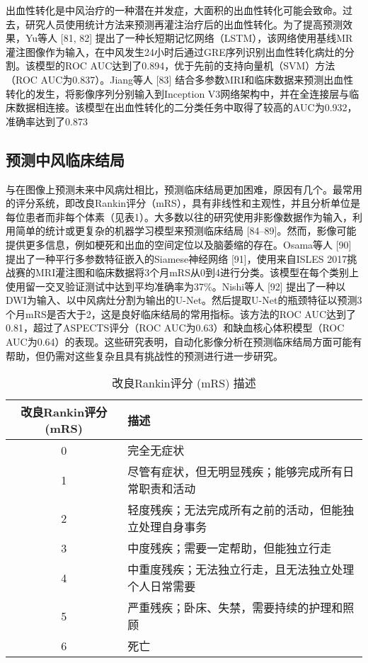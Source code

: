 \documentclass[11pt]{article}
\begin{document}
出血性转化是中风治疗的一种潜在并发症，大面积的出血性转化可能会致命。过去，研究人员使用统计方法来预测再灌注治疗后的出血性转化。为了提高预测效果，Yu等人 [81, 82] 提出了一种长短期记忆网络（LSTM），该网络使用基线MR灌注图像作为输入，在中风发生24小时后通过GRE序列识别出血性转化病灶的分割。该模型的ROC AUC达到了0.894，优于先前的支持向量机（SVM）方法（ROC AUC为0.837）。Jiang等人 [83] 结合多参数MRI和临床数据来预测出血性转化的发生，将影像序列分别输入到Inception V3网络架构中，并在全连接层与临床数据相连接。该模型在出血性转化的二分类任务中取得了较高的AUC为0.932，准确率达到了0.873

\subsection{\kaishu 预测中风临床结局}

与在图像上预测未来中风病灶相比，预测临床结局更加困难，原因有几个。最常用的评分系统，即改良Rankin评分（mRS），具有非线性和主观性，并且分析单位是每位患者而非每个体素（见表1）。大多数以往的研究使用非影像数据作为输入，利用简单的统计或更复杂的机器学习模型来预测临床结局 [84–89]。然而，影像可能提供更多信息，例如梗死和出血的空间定位以及脑萎缩的存在。Osama等人 [90] 提出了一种平行多参数特征嵌入的Siamese神经网络 [91]，使用来自ISLES 2017挑战赛的MRI灌注图和临床数据将3个月mRS从0到4进行分类。该模型在每个类别上使用留一交叉验证测试中达到平均准确率为37\%。Nishi等人 [92] 提出了一种以DWI为输入、以中风病灶分割为输出的U-Net。然后提取U-Net的瓶颈特征以预测3个月mRS是否大于2，这是良好临床结局的常用指标。该方法的ROC AUC达到了0.81，超过了ASPECTS评分（ROC AUC为0.63）和缺血核心体积模型（ROC AUC为0.64）的表现。这些研究表明，自动化影像分析在预测临床结局方面可能有帮助，但仍需对这些复杂且具有挑战性的预测进行进一步研究。

\begin{table}[h]
	\centering
	\begin{tabular}{|c|p{10cm}|}
		\hline
		\textbf{\kaishu 改良Rankin评分 (mRS)} & \textbf{\kaishu 描述} \\
		\hline
		0 & \kaishu 完全无症状 \\
		\hline
		1 & \kaishu 尽管有症状，但无明显残疾；能够完成所有日常职责和活动 \\
		\hline
		2 & \kaishu 轻度残疾；无法完成所有之前的活动，但能独立处理自身事务 \\
		\hline
		3 & \kaishu 中度残疾；需要一定帮助，但能独立行走 \\
		\hline
		4 & \kaishu 中重度残疾；无法独立行走，且无法独立处理个人日常需要 \\
		\hline
		5 & \kaishu 严重残疾；卧床、失禁，需要持续的护理和照顾 \\
		\hline
		6 & \kaishu 死亡 \\
		\hline
	\end{tabular}
	\caption{\kaishu 改良Rankin评分 (mRS) 描述}
	\label{Tab.1}
\end{table}
\end{document}
